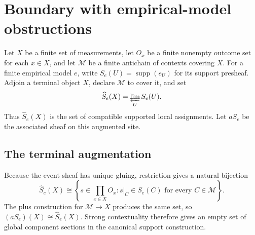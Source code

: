 \section{Boundary with empirical-model obstructions}
\label{sec:empirical-boundary}

Let \(X\) be a finite set of measurements, let \(O_x\) be a finite nonempty
outcome set for each \(x\in X\), and let \(\mathcal M\) be a finite antichain
of contexts covering \(X\).  For a finite empirical model \(e\), write
\(S_e(U)=\operatorname{supp}(e_U)\) for its support presheaf.  Adjoin a
terminal object \(X\), declare \(\mathcal M\) to cover it, and set
\[
 \widehat S_e(X)=\varprojlim_U S_e(U).
\]
Thus \(\widehat S_e(X)\) is the set of compatible supported local
assignments.  Let \(aS_e\) be the associated sheaf on this augmented site.

\subsection*{The terminal augmentation}

Because the event sheaf has unique gluing, restriction gives a natural
bijection
\begin{equation}\label{eq:contextual-global-set}
 \widehat S_e(X)
 \cong
 \left\{s\in\prod_{x\in X}O_x:
 s|_C\in S_e(C)\text{ for every }C\in\mathcal M\right\}.
\end{equation}
The plus construction for \(\mathcal M\to X\) produces the same set, so
\((aS_e)(X)\cong\widehat S_e(X)\).  Strong contextuality therefore gives an
empty set of global component sections in the canonical support construction.

